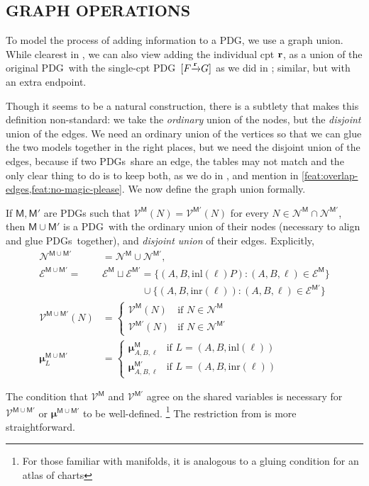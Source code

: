 \documentclass{article}
\newcommand{\notation}[2][]{#1}
\renewcommand{\notation}[2][]{{\color{notationcolor} #2}}
\newcommand{\vfullfootnote}[1]{}
\renewcommand{\vfullfootnote}[1]{\footnote{#1}}
\newcommand{\bmu}{\boldsymbol{\mu}}
\newcommand{\V}{\mathcal V}
\newcommand{\N}{\mathcal N}
\newcommand{\Ed}{\mathcal E}
\newcommand{\sfM}{\mathsf M}
\newcommand{\MN}{PDG}
\newcommand{\MNs}{\MN s}
\numberwithin{equation}{section}
\begin{document}
	\subsection{GRAPH OPERATIONS}
	To model the process of adding information to a \MN, we use a graph union. While clearest in , we can also view adding the individual cpt $\mathbf r$, as a union of the original \MN\ with the single-cpt \MN\ $[F \smash{\xrightarrow{\mathbf r}} G]$ as we did in ;  similar, but with an extra endpoint.
	
	Though it seems to be a natural construction, there is a subtlety that makes this definition non-standard: we take the \emph{ordinary} union of the nodes, but the \emph{disjoint} union of the edges. We need an ordinary union of the vertices so that we can glue the two models together in the right places, but we need the disjoint union of the edges, because if two \MNs\ share an edge, the tables may not match and the only clear thing to do is to keep both, as we do in , and mention in \cref{feat:overlap-edges,feat:no-magic-please}. 
	We now define the graph union formally. 

	\begin{defn}[union] \label{def:model-union}
		If $\sfM, \sfM'$ are \MN s such that $\V^\sfM(N) = \V^{\sfM'}(N)$ for every $N \in  \N^{\sfM} \cap \N^{\sfM'}$, then $\sfM \cup \sfM'$ is a \MN\ with the ordinary union of their nodes (necessary to align and glue \MNs\ together), and \emph{disjoint union} of their edges. \notation{Explicitly,
		\begin{align*}
			\N^{\sfM \cup \sfM'} &= \N^\sfM \cup \N^{\sfM'},  \\
			\Ed^{\sfM \cup \sfM'} \!=& \Ed^\sfM \sqcup \Ed^{\sfM'}\!
				=  \{ (A, B, \text{inl}(\ell)P) : (A,B,\ell)\in \Ed^\sfM \}  \\
					&\qquad\qquad \cup \{ (A, B, \text{inr}(\ell)) : (A,B,\ell)\in \Ed^{\sfM'} \} \\ 
			\V^{\sfM \cup \sfM'} (N) &= \begin{cases}
					\V^{\sfM}(N) & \text{if }N \in \N^\sfM \\
					\V^{\sfM'}(N) &\text{if }N \in \N^{\sfM'} 
				\end{cases}\\
			\bmu^{\sfM \cup \sfM'}_L &= \begin{cases}
				\bmu^{\sfM}_{A, B, \ell} &\text{if } L = (A, B, \text{inl} (\ell)) \\
				\bmu^{\sfM'}_{A, B, \ell} &\text{if } L = (A, B, \text{inr} (\ell)) 
			\end{cases}
		\end{align*}}
	\end{defn}
	The condition that $\V^\sfM$ and $\V^{\sfM'}$ agree on the shared variables is necessary for $\V^{\sfM\cup \sfM'}$ or $\bmu^{\sfM \cup \sfM'}$ to be well-defined.%
		\vfullfootnote{For those familiar with manifolds, it is analogous to a gluing condition for an atlas of charts}
	The restriction from  is more straightforward.%
	
\end{document}
